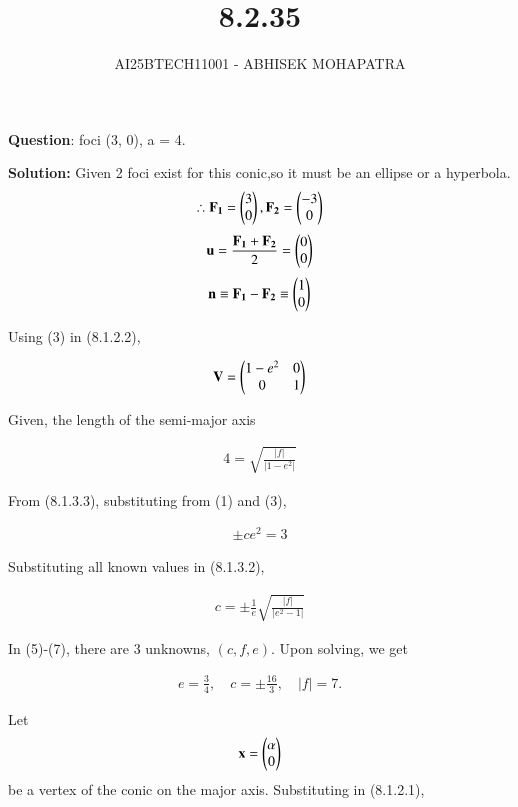 \documentclass[journal,12pt,onecolumn]{IEEEtran}
\begin{document}
\title{8.2.35}
\author{AI25BTECH11001 - ABHISEK MOHAPATRA}
{\let\newpage\relax\maketitle}
	
	 	\textbf{Question}:
foci (3, 0), a = 4.

		\textbf{Solution:}
		Given 2 foci exist for this conic,so it must be an ellipse or a hyperbola.
\begin{align}
		\therefore \mathbf{F_1} =\begin{pmatrix}3\\0\end{pmatrix}, \mathbf{F_2} =\begin{pmatrix}-3\\0\end{pmatrix}
\end{align}
\begin{align}
		\mathbf{u} = \frac{\mathbf{F_1}+\mathbf{F_2}}{2} = \begin{pmatrix}0\\0\end{pmatrix}
\end{align}
\begin{align}
		\mathbf{n} \equiv \mathbf{F_1} - \mathbf{F_2} \equiv \begin{pmatrix}1\\0\end{pmatrix}
\end{align}

Using (3) in (8.1.2.2),

\begin{align}
		\mathbf{V} = \begin{pmatrix}1-e^2 & 0 \\ 0 & 1\end{pmatrix}
\end{align}

Given, the length of the semi-major axis

\begin{align}
		4 = \sqrt{\frac{|f|}{|1-e^2|}}
\end{align}


From (8.1.3.3), substituting from (1) and (3),

\begin{align}
\pm c e^2 = 3
\end{align}

Substituting all known values in (8.1.3.2),

\begin{align}
c = \pm \frac{1}{e} \sqrt{\frac{|f|}{|e^2-1|}}
\end{align}

In (5)-(7), there are 3 unknowns, $(c, f, e)$. Upon solving, we get  

\begin{align}
e = \frac{3}{4}, 
\quad c = \pm \frac{16}{3}, 
\quad |f| = 7.
\end{align}

Let 
\begin{align}
		\mathbf{x} = \begin{pmatrix} \alpha\\0\end{pmatrix}
\end{align}
be a vertex of the conic on the major axis. Substituting in (8.1.2.1),
\end{document}

